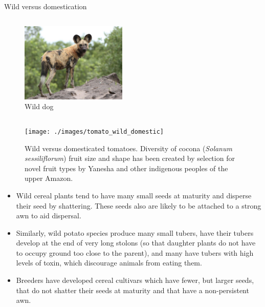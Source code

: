 \documentclass[11pt,ignorenonframetext,aspectratio=169]{beamer}
\begin{document}
\begin{frame}{Wild versus domestication}
\begin{columns}[T,onlytextwidth]
\begin{figure}
\includegraphics[width=0.45\textwidth, keepaspectratio]{./images/wild_dog_african} \caption{Wild dog}\label{fig:wild}
\end{figure}

\end{columns}
\end{frame}

\begin{frame}{}
\protect\hypertarget{section-2}{}
\begin{figure}
\texttt{[image: ./images/tomato\_wild\_domestic]} \caption{Wild versus domesticated tomatoes. Diversity of cocona (\textit{Solanum sessiliflorum}) fruit size and shape has been created by selection for novel fruit types by Yanesha and other indigenous peoples of the upper Amazon.}\label{fig:wild-vs-domesticated-tomato}
\end{figure}
\end{frame}

\begin{frame}{}
\protect\hypertarget{section-3}{}
\begin{itemize}
\item
  Wild cereal plants tend to have many small seeds at maturity and
  disperse their seed by shattering. These seeds also are likely to be
  attached to a strong awn to aid dispersal.
\item
  Similarly, wild potato species produce many small tubers, have their
  tubers develop at the end of very long stolons (so that daughter
  plants do not have to occupy ground too close to the parent), and many
  have tubers with high levels of toxin, which discourage animals from
  eating them.
\item
  Breeders have developed cereal cultivars which have fewer, but larger
  seeds, that do not shatter their seeds at maturity and that have a
  non-persistent awn.
\end{itemize}
\end{frame}
\end{document}

